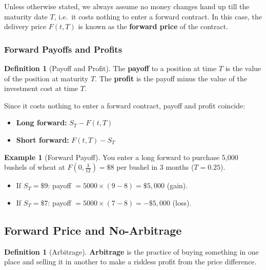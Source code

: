 \documentclass[12pt, a4paper]{article}
\theoremstyle{plain}
\theoremstyle{definition}
\newtheorem{definition}[theorem]{Definition}
\newtheorem{example}[theorem]{Example}
\theoremstyle{remark}
\newenvironment{sidenote}{%
  \par\vspace{0.5em}%
  \noindent\color{defcolor}%
}{%
  \par\vspace{0.5em}%
  \color{black}%
}
\begin{document}
\begin{sidenote}
  Unless otherwise stated, we always assume no money changes hand up till the maturity date $T$, i.e.\ it costs nothing to enter a forward contract. In this case, the delivery price $F(t,T)$ is known as the \textbf{forward price} of the contract.
\end{sidenote}

\subsubsection{Forward Payoffs and Profits}

\begin{definition}[Payoff and Profit]
  The \textbf{payoff} to a position at time $T$ is the value of the position at maturity $T$. The \textbf{profit} is the payoff minus the value of the investment cost at time $T$.

  Since it costs nothing to enter a forward contract, payoff and profit coincide:
  \begin{itemize}
    \item \textbf{Long forward:} $S_T - F(t,T)$
    \item \textbf{Short forward:} $F(t,T) - S_T$
  \end{itemize}
\end{definition}

\begin{example}[Forward Payoff]
  You enter a long forward to purchase 5{,}000 bushels of wheat at $F(0,\tfrac{3}{12}) = \$8$ per bushel in 3 months ($T = 0.25$).
  \begin{itemize}
    \item If $S_T = \$9$: payoff $= 5000 \times (9-8) = \$5{,}000$ (gain).
    \item If $S_T = \$7$: payoff $= 5000 \times (7-8) = -\$5{,}000$ (loss).
  \end{itemize}
\end{example}

\subsection{Forward Price and No-Arbitrage}

\begin{definition}[Arbitrage]
  \textbf{Arbitrage} is the practice of buying something in one place and selling it in another to make a riskless profit from the price difference.
\end{definition}
\end{document}
